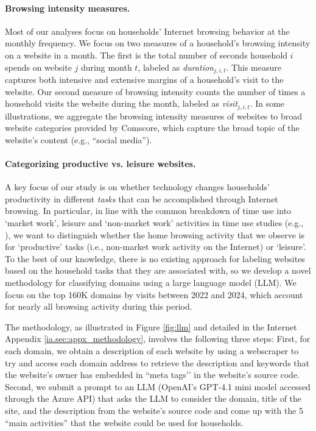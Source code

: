 \documentclass[12pt]{article}
\begin{document}
\paragraph{Browsing intensity measures.} Most of our analyses focus on households' Internet browsing behavior at the monthly frequency. We focus on two measures of a household's browsing intensity on a website in a month. The first is the total number of seconds household $i$ spends on website $j$ during month $t$, labeled as \textit{duration}$_{j,i,t}$. This measure captures both intensive and extensive margins of a household's visit to the website. Our second measure of browsing intensity counts the number of times a household visits the website during the month, labeled as \textit{visit}$_{j,i,t}$. In some illustrations, we aggregate the browsing intensity measures of websites to broad website categories provided by Comscore, which capture the broad topic of the website's content (e.g., ``social media'').



\paragraph{Categorizing productive vs. leisure websites.} 
A key focus of our study is on whether technology changes households' productivity in different \textit{tasks} that can be accomplished through Internet browsing. In particular, in line with the common breakdown of time use into `market work', leisure and `non-market work' activities in time use studies (e.g., \cite{aguiar2021}), we want to distinguish whether the home browsing activity that we observe is for `productive' tasks (i.e., non-market work activity on the Internet) or `leisure'. To the best of our knowledge, there is no existing approach for labeling websites based on the household tasks that they are associated with, so we develop a novel methodology for classifying domains using a large language model (LLM). We focus on the top 160K domains by visits between 2022 and 2024, which account for nearly all browsing activity during this period.  

The methodology, as illustrated in Figure \ref{fig:llm} and detailed in the Internet Appendix \ref{ia.sec:appx_methodology}, involves the following three steps: First, for each domain, we obtain a description of each website by using a webscraper to try and access each domain address to retrieve the description and keywords that the website’s owner has embedded in ``meta tags’’ in the website’s source code. Second, we submit a prompt to an LLM (OpenAI’s GPT-4.1 mini model accessed through the Azure API) that asks the LLM to consider the domain, title of the site, and the description from the website's source code and come up with the 5 ``main activities'' that the website could be used for households. 
\end{document}
